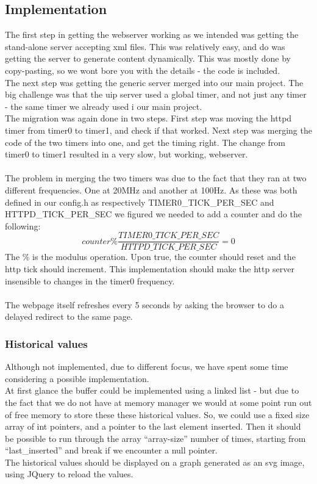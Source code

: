 \subsection{Implementation}
The first step in getting the webserver working as we intended was getting the stand-alone server accepting xml files. This was relatively easy, and do was getting the server to generate content dynamically. This was mostly done by copy-pasting, so we wont bore you with the details - the code is included.\\
The next step was getting the generic server merged into our main project. The big challenge was that the uip server used a global timer, and not just any timer - the same timer we already used i our main project.\\
The migration was again done in two steps. First step was moving the httpd timer from timer0 to timer1, and check if that worked. Next step was merging the code of the two timers into one, and get the timing right. The change from timer0 to timer1 resulted in a very slow, but working, webserver.\\\\
The problem in merging the two timers was due to the fact that they ran at two different frequencies. One at 20MHz and another at 100Hz. As these was both defined in our config.h as respectively TIMER0\_TICK\_PER\_SEC and HTTPD\_TICK\_PER\_SEC we figured we needed to add a counter and do the following:
\begin{equation}
  counter \% \frac{TIMER0\_TICK\_PER\_SEC}{HTTPD\_TICK\_PER\_SEC} = 0
\end{equation}
The \% is the modulus operation. Upon true, the counter should reset and the http tick should increment. This implementation should make the http server insensible to changes in the timer0 frequency.\\\\
The webpage itself refreshes every 5 seconds by asking the browser to do a delayed redirect to the same page.

\subsubsection{Historical values}
Although not implemented, due to different focus, we have spent some time considering a possible implementation.\\
At first glance the buffer could be implemented using a linked list - but due to the fact that we do not have at memory manager we would at some point run out of free memory to store these these historical values. So, we could use a fixed size array of int pointers, and a pointer to the last element inserted. Then it should be possible to run through the array ``array-size'' number of times, starting from ``last\_inserted'' and break if we encounter a null pointer.\\
The historical values should be displayed on a graph generated as an svg image, using JQuery to reload the values.


